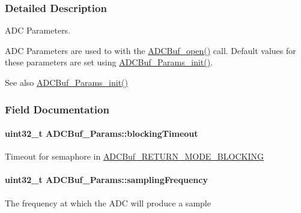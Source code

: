 \subsubsection{Detailed Description}
A\+D\+C Parameters. 

A\+D\+C Parameters are used to with the \hyperlink{_a_d_c_buf_8h_a0b63bca2e8f8e5b58f0c657ac662c97b}{A\+D\+C\+Buf\+\_\+open()} call. Default values for these parameters are set using \hyperlink{_a_d_c_buf_8h_ae6ddd34c34fd06cdede98fb01033cc47}{A\+D\+C\+Buf\+\_\+\+Params\+\_\+init()}.

\begin{DoxySeeAlso}{See also}
\hyperlink{_a_d_c_buf_8h_ae6ddd34c34fd06cdede98fb01033cc47}{A\+D\+C\+Buf\+\_\+\+Params\+\_\+init()} 
\end{DoxySeeAlso}


\subsubsection{Field Documentation}
\paragraph[{blocking\+Timeout}]{\setlength{\rightskip}{0pt plus 5cm}uint32\+\_\+t A\+D\+C\+Buf\+\_\+\+Params\+::blocking\+Timeout}\label{struct_a_d_c_buf___params_a3c3b5dab517e5d6bdc6dd68bda1e88d2}
Timeout for semaphore in \hyperlink{_a_d_c_buf_8h_a3d643e8024503c5ef2679c83419ba6eea5c6236b2f629b196d7874175be679399}{A\+D\+C\+Buf\+\_\+\+R\+E\+T\+U\+R\+N\+\_\+\+M\+O\+D\+E\+\_\+\+B\+L\+O\+C\+K\+I\+N\+G} 
\paragraph[{sampling\+Frequency}]{\setlength{\rightskip}{0pt plus 5cm}uint32\+\_\+t A\+D\+C\+Buf\+\_\+\+Params\+::sampling\+Frequency}\label{struct_a_d_c_buf___params_ad2ca9d85a9379652a86ea9235e4bec82}
The frequency at which the A\+D\+C will produce a sample 

